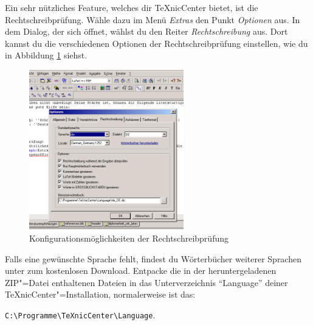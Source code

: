 Ein sehr nützliches Feature, welches dir TeXnicCenter bietet, ist die Rechtschreibprüfung. Wähle dazu im Menü \emph{Extras} den Punkt \emph{Optionen} aus. In dem Dialog, der sich öffnet, wählst du den Reiter \emph{Rechtschreibung} aus. Dort kannst du die verschiedenen Optionen der Rechtschreibprüfung einstellen, wie du in Abbildung \ref{fig:rechtschreibung} siehst.

\begin{figure}
	\centering
		\includegraphics[width=0.60\textwidth]{images/rechtschreibung.png}
	\caption{Konfigurationsmöglichkeiten der Rechtschreibprüfung}
	\label{fig:rechtschreibung}
\end{figure}

Falls eine gewünschte Sprache fehlt, findest du Wörterbücher weiterer Sprachen unter
zum kostenlosen Download. Entpacke die in der heruntergeladenen ZIP"=Datei enthaltenen Dateien in das Unterverzeichnis \enquote{Language} deiner TeXnicCenter"=Installation, normalerweise ist das:

\verb|C:\Programme\TeXnicCenter\Language|.

